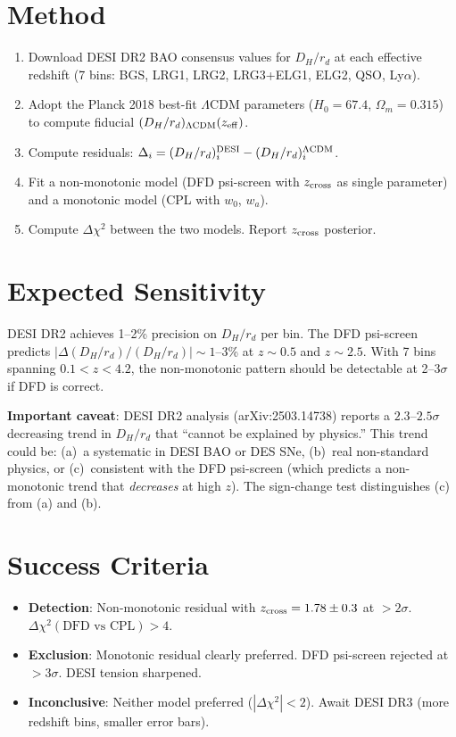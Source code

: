 \documentclass[11pt]{article}
\newcommand{\LCDM}{\Lambda\text{CDM}}
\begin{document}
\section{Method}

\begin{enumerate}[nosep]
\item Download DESI DR2 BAO consensus values for $D_H/r_d$ at each
  effective redshift (7 bins: BGS, LRG1, LRG2, LRG3+ELG1, ELG2,
  QSO, Ly$\alpha$).
\item Adopt the Planck 2018 best-fit $\LCDM$ parameters
  ($H_0 = 67.4$, $\Omega_m = 0.315$) to compute fiducial
  $(D_H/r_d)_{\LCDM}(z_{\rm eff})$.
\item Compute residuals: $\Delta_i = (D_H/r_d)_i^{\rm DESI} -
  (D_H/r_d)_i^{\LCDM}$.
\item Fit a non-monotonic model (DFD psi-screen with $z_{\rm cross}$
  as single parameter) and a monotonic model (CPL with $w_0$, $w_a$).
\item Compute $\Delta\chi^2$ between the two models. Report
  $z_{\rm cross}$ posterior.
\end{enumerate}

\section{Expected Sensitivity}

DESI DR2 achieves 1--2\% precision on $D_H/r_d$ per bin.
The DFD psi-screen predicts $|\Delta(D_H/r_d)/(D_H/r_d)| \sim 1$--3\%
at $z \sim 0.5$ and $z \sim 2.5$. With 7 bins spanning $0.1 < z < 4.2$,
the non-monotonic pattern should be detectable at 2--3$\sigma$ if DFD
is correct.

\textbf{Important caveat}: DESI DR2 analysis (arXiv:2503.14738) reports
a $2.3$--$2.5\sigma$ decreasing trend in $D_H/r_d$ that ``cannot be
explained by physics.'' This trend could be:
(a)~a systematic in DESI BAO or DES SNe,
(b)~real non-standard physics, or
(c)~consistent with the DFD psi-screen (which predicts a
non-monotonic trend that \emph{decreases} at high $z$).
The sign-change test distinguishes (c) from (a) and (b).

\section{Success Criteria}

\begin{itemize}[nosep]
\item \textbf{Detection}: Non-monotonic residual with
  $z_{\rm cross} = 1.78 \pm 0.3$ at $>2\sigma$.
  $\Delta\chi^2(\text{DFD vs CPL}) > 4$.
\item \textbf{Exclusion}: Monotonic residual clearly preferred.
  DFD psi-screen rejected at $>3\sigma$. DESI tension sharpened.
\item \textbf{Inconclusive}: Neither model preferred ($|\Delta\chi^2| < 2$).
  Await DESI DR3 (more redshift bins, smaller error bars).
\end{itemize}
\end{document}
